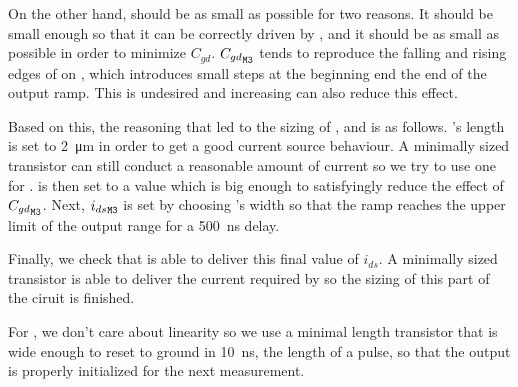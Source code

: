 On the other hand,  should be as small as possible for two reasons.
It should be small enough so that it can be correctly driven by , and it should be as small as possible in order to minimize $C_{gd}$.
${C_{gd}}_{\mathtt{M3}}$ tends to reproduce the falling and rising edges of  on , which introduces small steps at the beginning end the end of the output ramp.
This is undesired and increasing  can also reduce this effect.

Based on this, the reasoning that led to the sizing of ,  and  is as follows.
's length is set to \SI{2}{\micro\meter} in order to get a good current source behaviour.
A minimally sized transistor can still conduct a reasonable amount of current so we try to use one for .
 is then set to a value which is big enough to satisfyingly reduce the effect of ${C_{gd}}_{\mathtt{M3}}$.
Next, ${i_{ds}}_{\mathtt{M3}}$ is set by choosing 's width so that the ramp reaches the upper limit of the output range for a \SI{500}{\nano\second} delay.

Finally, we check that  is able to deliver this final value of $i_{ds}$.
A minimally sized transistor is able to deliver the current required by  so the sizing of this part of the ciruit is finished.

For , we don't care about linearity so we use a minimal length transistor that is wide enough to reset  to ground in \SI{10}{\nano\second}, the length of a pulse, so that the output is properly initialized for the next measurement.
